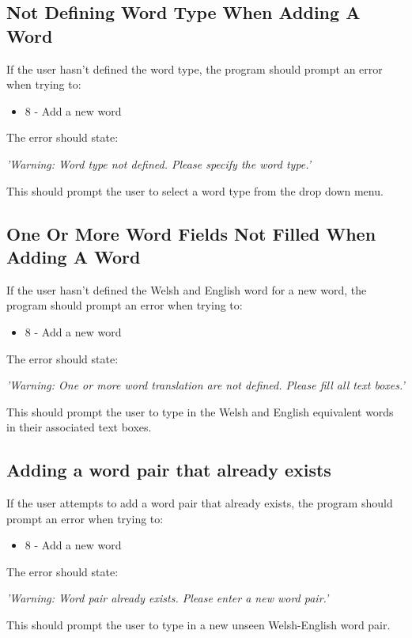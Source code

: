 \documentclass{project}
\begin{document}
\subsection{Not Defining Word Type When Adding A Word}
If the user hasn't defined the word type, the program should prompt an error when trying to:
\begin{itemize}
	\item 8 - Add a new word
	\end{itemize}
The error should state:
\begin{center}
	\emph{'Warning: Word type not defined. Please specify the word type.'}
\end{center}
This should prompt the user to select a word type from the drop down menu.
\subsection{One Or More Word Fields Not Filled When Adding A Word}
If the user hasn't defined the Welsh and English word for a new word, the program should prompt an error when trying to:
\begin{itemize}
	\item 8 - Add a new word
	\end{itemize}
The error should state:
\begin{center}
	\emph{'Warning: One or more word translation are not defined. Please fill all text boxes.'}
\end{center}
This should prompt the user to type in the Welsh and English equivalent words in their associated text boxes.
\subsection{Adding a word pair that already exists}
If the user attempts to add a word pair that already exists, the program should prompt an error when trying to:
\begin{itemize}
	\item 8 - Add a new word
	\end{itemize}
The error should state:
\begin{center}
	\emph{'Warning: Word pair already exists. Please enter a new word pair.'}
\end{center}
This should prompt the user to type in a new unseen Welsh-English word pair.
\end{document}
